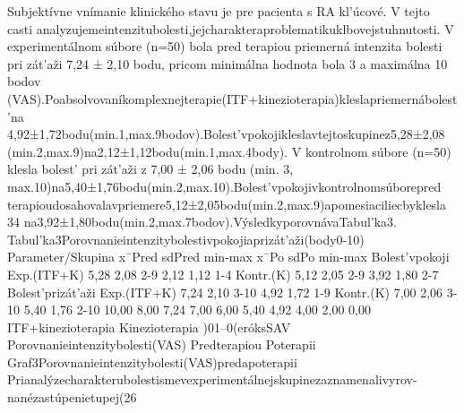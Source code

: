 Subjektívne vnímanie klinického stavu je pre pacienta s RA kl’úcové. V tejto casti analyzujemeintenzitubolesti,jejcharakteraproblematikuklbovejstuhnutosti. V experimentálnom súbore (n=50) bola pred terapiou priemerná intenzita bolesti pri zát’aži 7,24 ± 2,10 bodu, pricom minimálna hodnota bola 3 a maximálna 10 bodov (VAS).Poabsolvovaníkomplexnejterapie(ITF+kinezioterapia)kleslapriemernábolest’na 4,92±1,72bodu(min.1,max.9bodov).Bolest’vpokojikleslavtejtoskupinez5,28±2,08 (min.2,max.9)na2,12±1,12bodu(min.1,max.4body). V kontrolnom súbore (n=50) klesla bolest’ pri zát’aži z 7,00 ± 2,06 bodu (min. 3, max.10)na5,40±1,76bodu(min.2,max.10).Bolest’vpokojivkontrolnomsúborepred terapioudosahovalavpriemere5,12±2,05bodu(min.2,max.9)apomesiaciliecbyklesla 34 na3,92±1,80bodu(min.2,max.7bodov).VýsledkyporovnávaTabul’ka3. Tabul’ka3Porovnanieintenzitybolestivpokojiaprizát’aži(body0-10) Parameter/Skupina x¯Pred sdPred min-max x¯Po sdPo min-max Bolest’vpokoji Exp.(ITF+K) 5,28 2,08 2-9 2,12 1,12 1-4 Kontr.(K) 5,12 2,05 2-9 3,92 1,80 2-7 Bolest’prizát’aži Exp.(ITF+K) 7,24 2,10 3-10 4,92 1,72 1-9 Kontr.(K) 7,00 2,06 3-10 5,40 1,76 2-10 10,00 8,00 7,24 7,00 6,00 5,40 4,92 4,00 2,00 0,00 ITF+kinezioterapia Kinezioterapia )01--0(eróksSAV Porovnanieintenzitybolesti(VAS) Predterapiou Poterapii Graf3Porovnanieintenzitybolesti(VAS)predapoterapii Prianalýzecharakterubolestismevexperimentálnejskupinezaznamenalivyrov- nanézastúpenietupej(26%